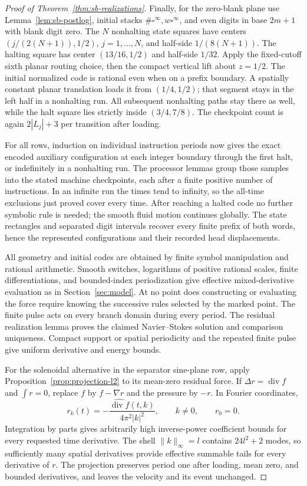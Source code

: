 \begin{proof}[Proof of Theorem~\ref{thm:sb-realizations}]
Finally, for the zero-blank plane use Lemma~\ref{lem:sb-postlog}, initial stacks $\#\square^\infty,w\square^\infty$, and even digits in base $2m+1$ with blank digit zero.  The $N$ nonhalting state squares have centers $(j/(2(N+1)),1/2)$, $j=1,\ldots,N$, and half-side $1/(8(N+1))$.  The halting square has center $(13/16,1/2)$ and half-side $1/32$.  Apply the fixed-cutoff sixth planar routing choice, then the compact vertical lift about $z=1/2$.  The initial normalized code is rational even when on a prefix boundary.  A spatially constant planar translation loads it from $(1/4,1/2)$; that segment stays in the left half in a nonhalting run.  All subsequent nonhalting paths stay there as well, while the halt square lies strictly inside $(3/4,7/8)$.  The checkpoint count is again $2|L_j|+3$ per transition after loading.

For all rows, induction on individual instruction periods now gives the exact encoded auxiliary configuration at each integer boundary through the first halt, or indefinitely in a nonhalting run.  The processor lemmas group those samples into the stated machine checkpoints, each after a finite positive number of instructions.  In an infinite run the times tend to infinity, so the all-time exclusions just proved cover every time.  After reaching a halted code no further symbolic rule is needed; the smooth fluid motion continues globally.  The state rectangles and separated digit intervals recover every finite prefix of both words, hence the represented configurations and their recorded head displacements.

All geometry and initial codes are obtained by finite symbol manipulation and rational arithmetic.  Smooth switches, logarithms of positive rational scales, finite differentiations, and bounded-index periodization give effective mixed-derivative evaluation as in Section~\ref{sec:model}.  At no point does constructing or evaluating the force require knowing the successive rules selected by the marked point.  The finite pulse acts on every branch domain during every period.  The residual realization lemma proves the claimed Navier--Stokes solution and comparison uniqueness.  Compact support or spatial periodicity and the repeated finite pulse give uniform derivative and energy bounds.

For the solenoidal alternative in the separator sine-plane row, apply Proposition~\ref{prop:projection-l2} to its mean-zero residual force.  If $\Delta r=\operatorname{div}f$ and $\int r=0$, replace $f$ by $f-\nabla r$ and the pressure by $-r$.  In Fourier coordinates,
\[
 r_k(t)=-\frac{\widehat{\operatorname{div}f}(t,k)}{4\pi^2|k|^2},\qquad k\ne0,
 \qquad r_0=0.
\]
Integration by parts gives arbitrarily high inverse-power coefficient bounds for every requested time derivative.  The shell $\|k\|_\infty=l$ contains $24l^2+2$ modes, so sufficiently many spatial derivatives provide effective summable tails for every derivative of $r$.  The projection preserves period one after loading, mean zero, and bounded derivatives, and leaves the velocity and its event unchanged.
\end{proof}

